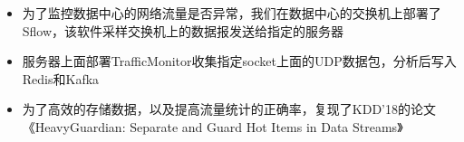 \documentclass[12pt,a4paper,ragged2e]{altacv}
\begin{document}

\begin{fullwidth}
\makecvheader
\end{fullwidth}




\divider


\setlength{\baselineskip}{18pt}
\begin{itemize}
\justifying
\item 为了监控数据中心的网络流量是否异常，我们在数据中心的交换机上部署了Sflow，该软件采样交换机上的数据报发送给指定的服务器
\item 服务器上面部署TrafficMonitor收集指定socket上面的UDP数据包，分析后写入Redis和Kafka
\item 为了高效的存储数据，以及提高流量统计的正确率，复现了KDD'18的论文《HeavyGuardian: Separate and Guard Hot Items in Data Streams》
\end{itemize}
\end{document}
